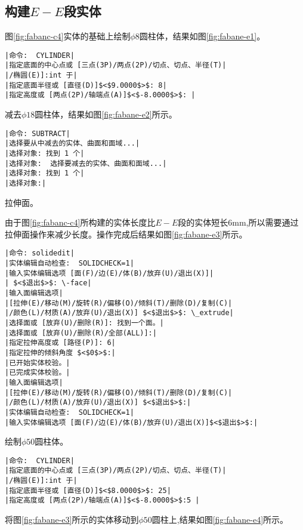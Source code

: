 \subsection{构建$E-E$段实体}
\begin{procedure}
\item 图\ref{fig:fabanc-c4}实体的基础上绘制$\phi 8$圆柱体，结果如图\ref{fig:fabane-e1}。
\begin{lstlisting}
|命令:  CYLINDER|
|指定底面的中心点或 [三点(3P)/两点(2P)/切点、切点、半径(T)|
|/椭圆(E)]:int 于|
|指定底面半径或 [直径(D)]$<$9.0000$>$: 8|
|指定高度或 [两点(2P)/轴端点(A)]$<$-8.0000$>$: |
\end{lstlisting}
\item 减去$\phi 18$圆柱体，结果如图\ref{fig:fabane-e2}所示。
\begin{lstlisting}
|命令: SUBTRACT|
|选择要从中减去的实体、曲面和面域...|
|选择对象: 找到 1 个|
|选择对象:  选择要减去的实体、曲面和面域...|
|选择对象: 找到 1 个|
|选择对象:|
\end{lstlisting}
\item 拉伸面。

由于图\ref{fig:fabanc-c4}所构建的实体长度比$E-E$段的实体短长6mm,所以需要通过拉伸面操作来减少长度。操作完成后结果如图\ref{fig:fabane-e3}所示。
\begin{lstlisting}
|命令: solidedit|
|实体编辑自动检查:  SOLIDCHECK=1|
|输入实体编辑选项 [面(F)/边(E)/体(B)/放弃(U)/退出(X)]|
| $<$退出$>$: \-face|
|输入面编辑选项|
|[拉伸(E)/移动(M)/旋转(R)/偏移(O)/倾斜(T)/删除(D)/复制(C)|
|/颜色(L)/材质(A)/放弃(U)/退出(X)] $<$退出$>$: \_extrude|
|选择面或 [放弃(U)/删除(R)]: 找到一个面。|
|选择面或 [放弃(U)/删除(R)/全部(ALL)]:|
|指定拉伸高度或 [路径(P)]: 6|
|指定拉伸的倾斜角度 $<$0$>$:|
|已开始实体校验。|
|已完成实体校验。|
|输入面编辑选项|
|[拉伸(E)/移动(M)/旋转(R)/偏移(O)/倾斜(T)/删除(D)/复制(C)|
|/颜色(L)/材质(A)/放弃(U)/退出(X)] $<$退出$>$:|
|实体编辑自动检查:  SOLIDCHECK=1|
|输入实体编辑选项 [面(F)/边(E)/体(B)/放弃(U)/退出(X)]$<$退出$>$:|
\end{lstlisting}
\begin{figure}[htbp]
\centering
\begin{floatrow}[3]
\end{floatrow}
\end{figure}
\item 绘制$\phi 50$圆柱体。
\begin{lstlisting}
|命令:  CYLINDER|
|指定底面的中心点或 [三点(3P)/两点(2P)/切点、切点、半径(T)|
|/椭圆(E)]:int 于|
|指定底面半径或 [直径(D)]$<$8.0000$>$: 25|
|指定高度或 [两点(2P)/轴端点(A)]$<$-8.0000$>$:5 |
\end{lstlisting}
\item 将图\ref{fig:fabane-e3}所示的实体移动到$\phi 50$圆柱上,结果如图\ref{fig:fabane-e4}所示。


\end{procedure}
